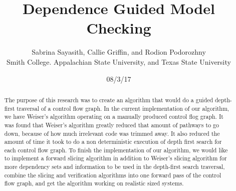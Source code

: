 \documentclass[peerreview]{IEEEtran}
\begin{document}
\title{Dependence Guided Model Checking}



\author{Sabrina Sayasith, Callie Griffin, and Rodion Podorozhny\\
Smith College. Appalachian State University, and Texas State University\\
}
\date{08/3/17}

\maketitle
\tableofcontents
\listoffigures

\IEEEpeerreviewmaketitle
\begin{abstract}
The purpose of this research was to create an algorithm that would do a guided depth-first traversal of a control flow graph. In the current implementation of our algorithm, we have Weiser's algorithm operating on a manually produced control flog graph. It was found that Weiser's algorithm greatly reduced that amount of pathways to go down, because of how much irrelevant code was trimmed away. It also reduced the amount of time it took to do a non deterministic execution of depth first search for each control flow graph. To finish the implementation of our algorithm, we would like to implement a forward slicing algorithm in addition to Weiser’s slicing algorithm for more dependency sets and information to be used in the depth-first search traversal, combine the slicing and verification algorithms into one forward pass of the control flow graph, and get the algorithm working on realistic sized systems. 
\end{abstract}
\end{document}
